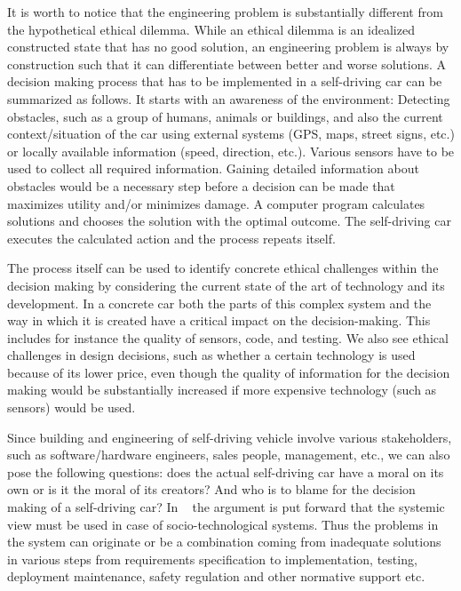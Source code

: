 It is worth to notice that the engineering problem is substantially different from the hypothetical ethical dilemma. While an ethical dilemma is an idealized constructed state that has no good solution, an engineering problem is always by construction such that it can differentiate between better and worse solutions. A decision making process that has to be implemented in a self-driving car can be summarized as follows. It starts with an awareness of the environment: Detecting obstacles, such as a group of humans, animals or buildings, and also the current context/situation of the car using external systems (GPS, maps, street signs, etc.) or locally available information (speed, direction, etc.). Various sensors have to be used to collect all required information. Gaining detailed information about obstacles would be a necessary step before a decision can be made that maximizes utility and/or minimizes damage. A computer program calculates solutions and chooses the solution with the optimal outcome. The self-driving car executes the calculated action and the process repeats itself.

The process itself can be used to identify concrete ethical challenges within the decision making by considering the current state of the art of technology and its development. In a concrete car both the parts of this complex system and the way in which it is created have a critical impact on the decision-making. This includes for instance the quality of sensors, code, and testing. We also see ethical challenges in design decisions, such as whether a certain technology is used because of its lower price, even though the quality of information for the decision making would be substantially increased if more expensive technology (such as sensors) would be used.

Since building and engineering of self-driving vehicle involve various stakeholders, such as software/hardware engineers, sales people, management, etc., we can also pose the following questions: does the actual self-driving car have a moral on its own or is it the moral of its creators? And who is to blame for the decision making of a self-driving car? In ~\cite{DodigCrnkovic2012} the argument is put forward that the systemic view must be used in case of socio-technological systems. Thus the problems in the system can originate or be a combination coming from inadequate solutions in various steps from requirements specification to implementation, testing, deployment maintenance, safety regulation and other normative support etc. 

